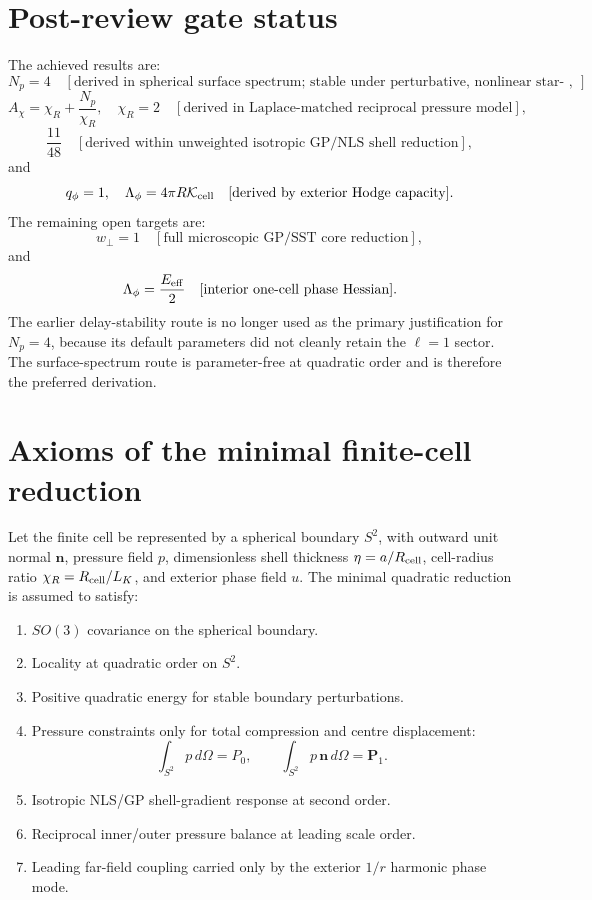 \documentclass[11pt]{article}
\begin{document}
\section{Post-review gate status}

The achieved results are:
\[
  N_p=4
  \quad [\text{derived in spherical surface spectrum; stable under perturbative, nonlinear star-shaped, and finite-perimeter global-topology checks}],
\]
\[
  A_\chi=\chi_R+\frac{N_p}{\chi_R},\quad \chi_R=2
  \quad [\text{derived in Laplace-matched reciprocal pressure model}],
\]
\[
  \frac{11}{48}
  \quad [\text{derived within unweighted isotropic GP/NLS shell reduction}],
\]
and
\[
  q_\phi=1,\quad \Lambda_\phi=4\pi R\mathcal K_{\rm cell}
  \quad [\text{derived by exterior Hodge capacity}].
\]
The remaining open targets are:
\[
  w_\perp=1
  \quad [\text{full microscopic GP/SST core reduction}],
\]
and
\[
  \Lambda_\phi=\frac{E_{\rm eff}}{2}
  \quad [\text{interior one-cell phase Hessian}].
\]
The earlier delay-stability route is no longer used as the primary justification
for \(N_p=4\), because its default parameters did not cleanly retain the
\(\ell=1\) sector.  The surface-spectrum route is parameter-free at quadratic
order and is therefore the preferred derivation.

\section{Axioms of the minimal finite-cell reduction}

Let the finite cell be represented by a spherical boundary \(S^2\), with
outward unit normal \(\mathbf n\), pressure field \(p\), dimensionless shell
thickness \(\eta=a/R_{\rm cell}\), cell-radius ratio
\(\chi_R=R_{\rm cell}/L_K\), and exterior phase field \(u\).  The minimal
quadratic reduction is assumed to satisfy:
\begin{enumerate}[label=A\arabic*.]
\item \(SO(3)\) covariance on the spherical boundary.
\item Locality at quadratic order on \(S^2\).
\item Positive quadratic energy for stable boundary perturbations.
\item Pressure constraints only for total compression and centre displacement:
\[
  \int_{S^2}p\,d\Omega=P_0,\qquad
  \int_{S^2}p\,\mathbf n\,d\Omega=\mathbf P_1.
\]
\item Isotropic NLS/GP shell-gradient response at second order.
\item Reciprocal inner/outer pressure balance at leading scale order.
\item Leading far-field coupling carried only by the exterior \(1/r\) harmonic
phase mode.
\end{enumerate}
\end{document}
